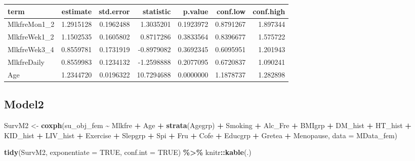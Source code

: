\documentclass[
]{article}
\newenvironment{Shaded}{\begin{snugshade}}{\end{snugshade}}
\newcommand{\DataTypeTok}[1]{\textcolor[rgb]{0.13,0.29,0.53}{#1}}
\newcommand{\KeywordTok}[1]{\textcolor[rgb]{0.13,0.29,0.53}{\textbf{#1}}}
\newcommand{\NormalTok}[1]{#1}
\newcommand{\OperatorTok}[1]{\textcolor[rgb]{0.81,0.36,0.00}{\textbf{#1}}}
\newcommand{\OtherTok}[1]{\textcolor[rgb]{0.56,0.35,0.01}{#1}}
\newcommand{\StringTok}[1]{\textcolor[rgb]{0.31,0.60,0.02}{#1}}
\begin{document}
\begin{longtable}[]{@{}lrrrrrr@{}}
\toprule
term & estimate & std.error & statistic & p.value & conf.low &
conf.high\tabularnewline
\midrule
\endhead
MlkfreMon1\_2 & 1.2915128 & 0.1962488 & 1.3035201 & 0.1923972 &
0.8791267 & 1.897344\tabularnewline
MlkfreWek1\_2 & 1.1502535 & 0.1605802 & 0.8717286 & 0.3833564 &
0.8396677 & 1.575722\tabularnewline
MlkfreWek3\_4 & 0.8559781 & 0.1731919 & -0.8979082 & 0.3692345 &
0.6095951 & 1.201943\tabularnewline
MlkfreDaily & 0.8559983 & 0.1234132 & -1.2598888 & 0.2077095 & 0.6720837
& 1.090241\tabularnewline
Age & 1.2344720 & 0.0196322 & 10.7294688 & 0.0000000 & 1.1878737 &
1.282898\tabularnewline
\bottomrule
\end{longtable}

\hypertarget{model2-6}{%
\subsection{Model2}\label{model2-6}}

\begin{Shaded}
\begin{Highlighting}[]
\NormalTok{SurvM2 \textless{}{-}}\StringTok{  }\KeywordTok{coxph}\NormalTok{(su\_obj\_fem }\OperatorTok{\textasciitilde{}}\StringTok{ }\NormalTok{Mlkfre }\OperatorTok{+}\StringTok{ }\NormalTok{Age }\OperatorTok{+}\StringTok{ }\KeywordTok{strata}\NormalTok{(Agegrp) }\OperatorTok{+}\StringTok{ }\NormalTok{Smoking }\OperatorTok{+}\StringTok{ }\NormalTok{Alc\_Fre }\OperatorTok{+}\StringTok{ }
\StringTok{                   }\NormalTok{BMIgrp }\OperatorTok{+}\StringTok{ }\NormalTok{DM\_hist }\OperatorTok{+}\StringTok{ }\NormalTok{HT\_hist }\OperatorTok{+}\StringTok{ }\NormalTok{KID\_hist }\OperatorTok{+}\StringTok{ }\NormalTok{LIV\_hist }\OperatorTok{+}\StringTok{ }\NormalTok{Exercise }\OperatorTok{+}\StringTok{ }
\StringTok{                   }\NormalTok{Slepgrp }\OperatorTok{+}\StringTok{ }\NormalTok{Spi }\OperatorTok{+}\StringTok{ }\NormalTok{Fru }\OperatorTok{+}\StringTok{ }\NormalTok{Cofe }\OperatorTok{+}\StringTok{ }\NormalTok{Educgrp }\OperatorTok{+}\StringTok{ }\NormalTok{Gretea }\OperatorTok{+}\StringTok{ }\NormalTok{Menopause, }
                 \DataTypeTok{data =}\NormalTok{ MData\_fem)}

\KeywordTok{tidy}\NormalTok{(SurvM2, }\DataTypeTok{exponentiate =} \OtherTok{TRUE}\NormalTok{, }\DataTypeTok{conf.int =} \OtherTok{TRUE}\NormalTok{) }\OperatorTok{\%\textgreater{}\%}\StringTok{ }
\StringTok{  }\NormalTok{knitr}\OperatorTok{::}\KeywordTok{kable}\NormalTok{(.)}
\end{Highlighting}
\end{Shaded}
\end{document}
